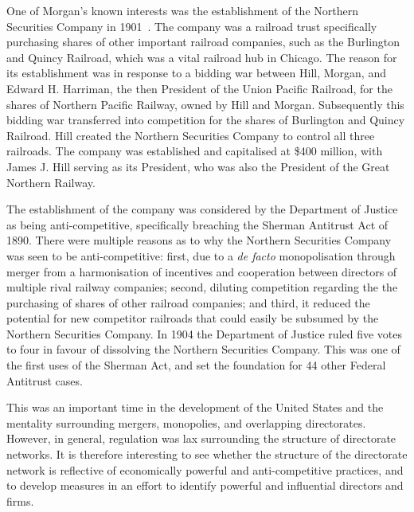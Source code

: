 One of Morgan's known interests was the establishment of the Northern Securities Company in 1901~\citep{Langdell1903}. The company was a railroad trust specifically purchasing shares of other important railroad companies, such as the Burlington and Quincy Railroad, which was a vital railroad hub in Chicago. The reason for its establishment was in response to a bidding war between Hill, Morgan, and Edward H. Harriman, the then President of the Union Pacific Railroad, for the shares of Northern Pacific Railway, owned by Hill and Morgan. Subsequently this bidding war transferred into competition for the shares of Burlington and Quincy Railroad. Hill created the Northern Securities Company to control all three railroads. The company was established and capitalised at \$400 million, with James J. Hill serving as its President, who was also the President of the Great Northern Railway.

The establishment of the company was considered by the Department of Justice as being anti-competitive, specifically breaching the Sherman Antitrust Act of 1890. There were multiple reasons as to why the Northern Securities Company was seen to be anti-competitive: first, due to a \emph{de facto} monopolisation through merger from a harmonisation of incentives and cooperation between directors of multiple rival railway companies; second, diluting competition regarding the the purchasing of shares of other railroad companies; and third, it reduced the potential for new competitor railroads that could easily be subsumed by the Northern Securities Company. In 1904 the Department of Justice ruled five votes to four in favour of dissolving the Northern Securities Company. This was one of the first uses of the Sherman Act, and set the foundation for 44 other Federal Antitrust cases.

This was an important time in the development of the United States and the mentality surrounding mergers, monopolies, and overlapping directorates. However, in general, regulation was lax surrounding the structure of directorate networks. It is therefore interesting to see whether the structure of the directorate network is reflective of economically powerful and anti-competitive practices, and to develop measures in an effort to identify powerful and influential directors and firms.

